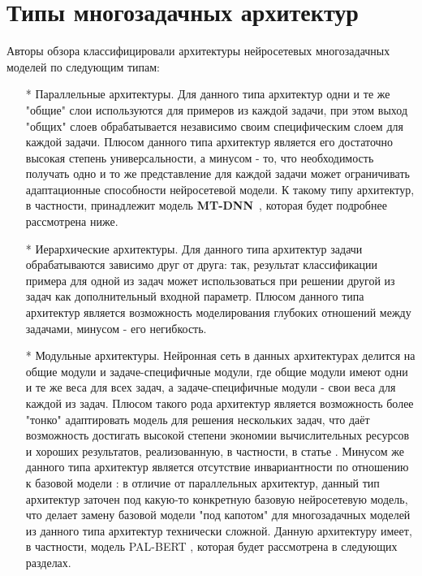 \section{Типы многозадачных архитектур}
Авторы обзора \cite{chen_2021} классифицировали архитектуры нейросетевых многозадачных моделей по следующим типам:
\begin{itemize}
\item[*] Параллельные архитектуры. Для данного типа архитектур одни и те же "общие" слои используются для примеров из каждой задачи, при этом выход "общих" слоев обрабатывается независимо своим специфическим слоем для каждой задачи. Плюсом данного типа архитектур является его достаточно высокая степень универсальности, а минусом - то, что необходимость получать одно и то же представление для каждой задачи может ограничивать адаптационные способности нейросетевой модели. К такому типу архитектур, в частности, принадлежит модель \textbf{MT-DNN}~\cite{mtdnn}, которая будет подробнее рассмотрена ниже. 
\item[*] Иерархические архитектуры. Для данного типа архитектур задачи обрабатываются зависимо друг от друга: так, результат классификации примера для одной из задач может использоваться при решении другой из задач как дополнительный входной параметр. Плюсом данного типа архитектур является возможность моделирования глубоких отношений между задачами, минусом - его негибкость. 
\item[*] Модульные архитектуры. Нейронная сеть в данных архитектурах делится на общие модули и задаче-специфичные модули, где общие модули имеют одни и те же веса для всех задач, а задаче-специфичные модули - свои веса для каждой из задач. Плюсом такого рода архитектур является возможность более "тонко" адаптировать модель для решения нескольких задач, что даёт возможность достигать высокой степени экономии вычислительных ресурсов и хороших результатов, реализованную, в частности, в статье \cite{maziarka_2021}. Минусом же данного типа архитектур является отсутствие инвариантности по отношению к базовой модели : в отличие от параллельных архитектур, данный тип архитектур заточен под какую-то конкретную базовую нейросетевую модель, что делает замену базовой модели "под капотом" для многозадачных моделей из данного типа архитектур технически сложной. Данную архитектуру имеет, в частности, модель PAL-BERT  \cite{stickland_2019}, которая будет рассмотрена в следующих разделах. 

\end{itemize}
